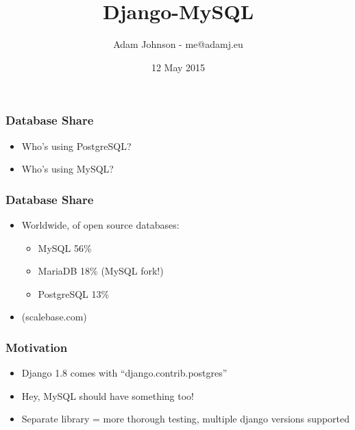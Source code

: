\documentclass{beamer}
\title{Django-MySQL}
\author{Adam Johnson - me@adamj.eu}
\date{12 May 2015}
\begin{document}
\maketitle


\begin{frame}[fragile]\frametitle{Database Share}

    \begin{itemize}
        \item Who's using PostgreSQL?
        \item Who's using MySQL?
    \end{itemize}

\end{frame}


\begin{frame}[fragile]\frametitle{Database Share}

    \begin{itemize}
        \item Worldwide, of open source databases:
        \begin{itemize}
            \item MySQL 56\%
            \item MariaDB 18\% (MySQL fork!)
            \item PostgreSQL 13\%
        \end{itemize}
        \item (scalebase.com)
    \end{itemize}

\end{frame}


\begin{frame}[fragile]\frametitle{Motivation}

    \begin{itemize}
        \item Django 1.8 comes with ``django.contrib.postgres''
        \item Hey, MySQL should have something too!
        \item Separate library = more thorough testing, multiple django versions supported
    \end{itemize}

\end{frame}
\end{document}
